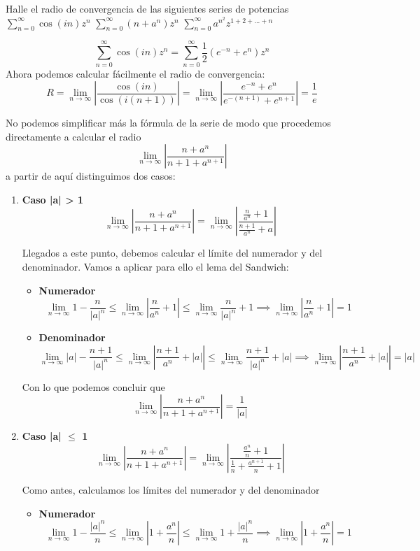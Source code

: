 \begin{problem}[12]
Halle el radio de convergencia de las siguientes series de potencias
\ppart[d] $\displaystyle\sum_{n=0}^{\infty} \cos(in)z^n$
\ppart[f] $\displaystyle\sum_{n=0}^{\infty} (n+a^n)z^n$
\ppart[i] $\displaystyle\sum_{n=0}^{∞} a^{n^2} z^{1+2+...+n}$
\solution

\spart[d]
\[\sum_{n=0}^{\infty} \cos(in)z^n = \sum_{n=0}^{\infty}\frac{1}{2}\left(e^{-n}+e^n \right)z^n\]
Ahora podemos calcular fácilmente el radio de convergencia:
\[R = \lim_{n \to \infty}\left| \frac{\cos(in)}{\cos\left(i(n+1)\right)}\right| = \lim_{n \to \infty}\left| \frac{e^{-n}+e^n}{e^{-(n+1)}+e^{n+1}}\right|=\frac{1}{e}\]

\spart[f]
No podemos simplificar más la fórmula de la serie de modo que procedemos directamente a calcular el radio
\[\lim_{n\to \infty}\left| \frac{n+a^n}{n+1+a^{n+1}}\right|\]
a partir de aquí distinguimos dos casos:
\begin{enumerate}
\item \textbf{ Caso |a| > 1}
\[\lim_{n\to \infty}\left| \frac{n+a^n}{n+1+a^{n+1}}\right| = \lim_{n \to \infty} \left|\frac{\frac{n}{a^n}+1}{\frac{n+1}{a^n}+a} \right| \]

Llegados a este punto, debemos calcular el límite del numerador y del denominador. Vamos a aplicar para ello el lema del Sandwich:
\begin{itemize}
\item \textbf{Numerador}
\[\lim_{n \to \infty} 1-\frac{n}{|a|^n}\leq \lim_{n \to \infty} \left|\frac{n}{a^n}+1 \right| \leq \lim_{n \to \infty} \frac{n}{|a|^n}+1 \implies \lim_{n \to \infty} \left|\frac{n}{a^n}+1 \right|  = 1\]

\item \textbf{Denominador}
\[\lim_{n \to \infty} |a|-\frac{n+1}{|a|^n}\leq \lim_{n \to \infty} \left|\frac{n+1}{a^n}+|a| \right| \leq \lim_{n \to \infty} \frac{n+1}{|a|^n}+|a| \implies \lim_{n \to \infty} \left|\frac{n+1}{a^n}+|a| \right|  = |a|\]
\end{itemize}

Con lo que podemos concluir que
\[\lim_{n\to \infty}\left| \frac{n+a^n}{n+1+a^{n+1}}\right| = \frac{1}{|a|}\]

\item \textbf{Caso |a| $\leq$ 1}
\[\lim_{n\to \infty}\left| \frac{n+a^n}{n+1+a^{n+1}}\right| = \lim_{n \to \infty} \left|\frac{\frac{a^n}{n}+1}{\frac{1}{n}+\frac{a^{n+1}}{n}+1} \right| \]

Como antes, calculamos los límites del numerador y del denominador
\begin{itemize}
\item \textbf{Numerador}
\[\lim_{n\to \infty} 1-\frac{|a|^n}{n} \leq \lim_{n\to \infty}\left| 1+\frac{a^n}{n} \right|  \leq \lim_{n\to \infty}1+\frac{|a|^n}{n} \implies \lim_{n\to \infty} \left| 1+\frac{a^n}{n} \right| = 1\]


\end{itemize}
\end{enumerate}
\end{problem}
